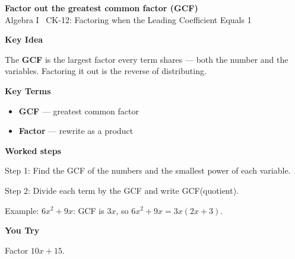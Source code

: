 \documentclass[12pt]{article}
\begin{document}
\begin{center}{\Large \textbf{Factor out the greatest common factor (GCF)}}\\[2pt]{\small Algebra I \textbar\ CK-12: Factoring when the Leading Coefficient Equals 1}\end{center}\vspace{0.25cm}

{\large\textbf{Key Idea}}\par\smallskip
The \textbf{GCF} is the largest factor every term shares — both the number and the variables. Factoring it out is the reverse of distributing.\par


{\large\textbf{Key Terms}}\par\smallskip
\begin{itemize}[leftmargin=1.4em]
  \item \textbf{GCF} — greatest common factor
  \item \textbf{Factor} — rewrite as a product
\end{itemize}


{\large\textbf{Worked steps}}\par\smallskip
Step 1: Find the GCF of the numbers and the smallest power of each variable.\par
Step 2: Divide each term by the GCF and write GCF(quotient).\par
Example: $6x^2+9x$: GCF is $3x$, so $6x^2+9x=3x(2x+3)$.\par


{\large\textbf{You Try}}\par\smallskip
Factor $10x+15$.\par
\end{document}
